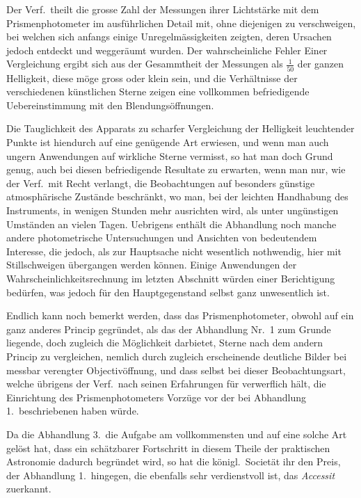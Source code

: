 \documentclass[12pt,a4paper]{article}
\begin{document}
Der Verf.\ theilt die grosse Zahl der Messungen ihrer Lichtst\"arke mit dem Prismenphotometer im ausf\"uhrlichen Detail mit, ohne diejenigen zu verschweigen, bei welchen sich anfangs einige Unregelm\"assigkeiten zeigten, deren Ursachen jedoch entdeckt und wegger\"aumt wurden. Der wahrscheinliche Fehler Einer Vergleichung ergibt sich aus der Gesammtheit der Messungen als $\frac{1}{50}$ der ganzen Helligkeit, diese m\"oge gross oder klein sein, und die Verh\"altnisse der verschiedenen k\"unstlichen Sterne zeigen eine vollkommen befriedigende Uebereinstimmung mit den Blendungs\"offnungen.

Die Tauglichkeit des Apparats zu scharfer Vergleichung der Helligkeit leuchtender Punkte ist hiendurch auf eine gen\"ugende Art erwiesen, und wenn man auch ungern Anwendungen auf wirkliche Sterne vermisst, so hat man doch Grund genug, auch bei diesen befriedigende Resultate zu erwarten, wenn man nur, wie der Verf.\ mit Recht verlangt, die Beobachtungen auf besonders g\"unstige atmosph\"arische Zust\"ande beschr\"ankt, wo man, bei der leichten Handhabung des Instruments, in wenigen Stunden mehr ausrichten wird, als unter ung\"unstigen Umst\"anden an vielen Tagen. Uebrigens enth\"alt die Abhandlung noch manche andere photometrische Untersuchungen und Ansichten von bedeutendem Interesse, die jedoch, als zur Hauptsache nicht wesentlich nothwendig, hier mit Stillschweigen \"ubergangen werden k\"onnen. Einige Anwendungen der Wahrscheinlichkeitsrechnung im letzten Abschnitt w\"urden einer Berichtigung bed\"urfen, was jedoch f\"ur den Hauptgegenstand selbst ganz unwesentlich ist.

Endlich kann noch bemerkt werden, dass das Prismenphotometer, obwohl auf ein ganz anderes Princip gegr\"undet, als das der Abhandlung Nr.\ 1 zum Grunde liegende, doch zugleich die M\"oglichkeit darbietet, Sterne nach dem andern Princip zu vergleichen, nemlich durch zugleich erscheinende deutliche Bilder bei messbar verengter Objectiv\"offnung, und dass selbst bei dieser Beobachtungsart, welche \"ubrigens der Verf.\ nach seinen Erfahrungen f\"ur verwerflich h\"alt, die Einrichtung des Prismenphotometers Vorz\"uge vor der bei Abhandlung 1.\ beschriebenen haben w\"urde.

Da die Abhandlung 3.\ die Aufgabe am vollkommensten und auf eine solche Art gel\"ost hat, dass ein sch\"atzbarer Fortschritt in diesem Theile der praktischen Astronomie dadurch begr\"undet wird, so hat die k\"onigl.\ Societ\"at ihr den Preis, der Abhandlung 1.\ hingegen, die ebenfalls sehr verdienstvoll ist, das \textit{Accessit} zuerkannt.
\end{document}
